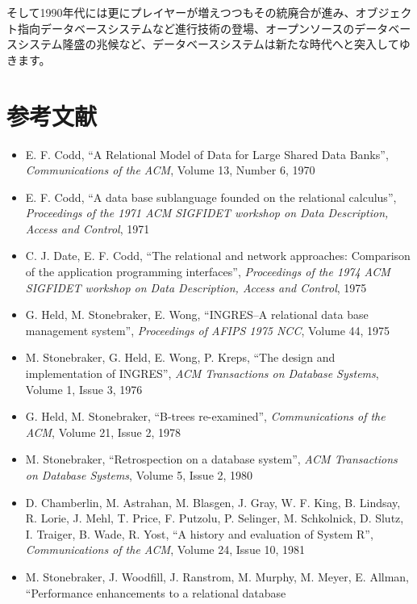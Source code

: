 そして1990年代には更にプレイヤーが増えつつもその統廃合が進み、オブジェク
ト指向データベースシステムなど進行技術の登場、オープンソースのデータベー
スシステム隆盛の兆候など、データベースシステムは新たな時代へと突入してゆ
きます。

\section*{参考文献}

\small

\begin{itemize}
 \item E. F. Codd, ``A Relational Model of Data for Large Shared Data
       Banks'', {\it Communications of the ACM}, Volume 13, Number 6,
       1970
 \item E. F. Codd, ``A data base sublanguage founded on the relational
       calculus'', {\it Proceedings of the 1971 ACM SIGFIDET workshop
       on Data Description, Access and Control}, 1971
 \item C. J. Date, E. F. Codd, ``The relational and network approaches: Comparison of the
       application programming interfaces'', {\it Proceedings of the
       1974 ACM SIGFIDET workshop on Data Description, Access and
       Control}, 1975
 \item G. Held, M. Stonebraker, E. Wong, ``INGRES--A relational data
       base management system'', {\it Proceedings of AFIPS 1975 NCC},
       Volume 44, 1975
 \item M. Stonebraker, G. Held, E. Wong, P. Kreps, ``The design and
       implementation of INGRES'', {\it ACM Transactions on Database
       Systems}, Volume 1, Issue 3, 1976
 \item G. Held, M. Stonebraker, ``B-trees re-examined'', {\it Communications of the
       ACM}, Volume 21, Issue 2, 1978
 \item M. Stonebraker, ``Retrospection on a database system'', {\it ACM
       Transactions on Database Systems}, Volume 5, Issue 2, 1980
 \item D. Chamberlin, M. Astrahan, M. Blasgen, J. Gray, W. F. King,
       B. Lindsay, R. Lorie, J. Mehl, T. Price, F. Putzolu, P. Selinger,
       M. Schkolnick, D. Slutz, I. Traiger, B. Wade, R. Yost, ``A
       history and evaluation of System R'', {\it Communications of the
       ACM}, Volume 24, Issue 10, 1981
 \item M. Stonebraker, J. Woodfill, J. Ranstrom, M. Murphy, M. Meyer,
       E. Allman, ``Performance enhancements to a relational database

\end{itemize}
